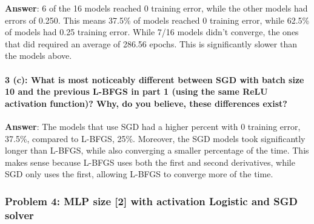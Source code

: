 \documentclass[11pt]{article}
\begin{document}
    \textbf{Answer}: 6 of the 16 models reached 0 training error, while the
other models had errors of 0.250. This means 37.5\% of models reached 0
training error, while 62.5\% of models had 0.25 training error. While
7/16 models didn't converge, the ones that did required an average of
286.56 epochs. This is significantly slower than the models above.

    \hypertarget{c-what-is-most-noticeably-different-between-sgd-with-batch-size-10-and-the-previous-l-bfgs-in-part-1-using-the-same-relu-activation-function-why-do-you-believe-these-differences-exist}{%
\paragraph{3 (c): What is most noticeably different between SGD with
batch size 10 and the previous L-BFGS in part 1 (using the same ReLU
activation function)? Why, do you believe, these differences
exist?}\label{c-what-is-most-noticeably-different-between-sgd-with-batch-size-10-and-the-previous-l-bfgs-in-part-1-using-the-same-relu-activation-function-why-do-you-believe-these-differences-exist}}

    \textbf{Answer}: The models that use SGD had a higher percent with 0
training error, 37.5\%, compared to L-BFGS, 25\%. Moreover, the SGD
models took significantly longer than L-BFGS, while also converging a
smaller percentage of the time. This makes sense because L-BFGS uses
both the first and second derivatives, while SGD only uses the first,
allowing L-BFGS to converge more of the time.

    \hypertarget{problem-4-mlp-size-2-with-activation-logistic-and-sgd-solver}{%
\subsubsection{Problem 4: MLP size {[}2{]} with activation Logistic and
SGD
solver}\label{problem-4-mlp-size-2-with-activation-logistic-and-sgd-solver}}
\end{document}

